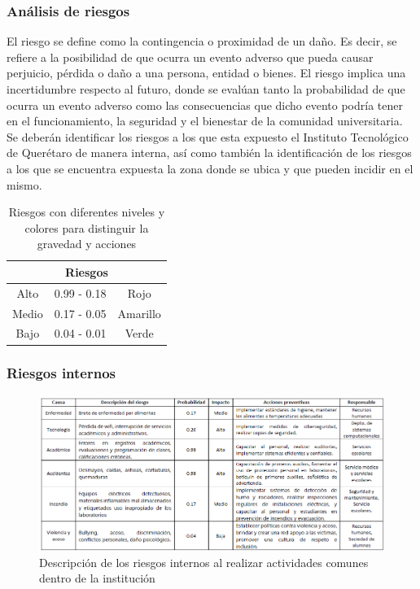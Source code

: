     \subsubsection{ Análisis de riesgos}
    El riesgo se define como la contingencia o proximidad de un daño.\cite{RAE} Es decir, se refiere a la posibilidad de que ocurra un evento adverso que pueda causar perjuicio, pérdida o daño a una persona, entidad o bienes. El riesgo implica una incertidumbre respecto al futuro, donde se evalúan tanto la probabilidad de que ocurra un evento adverso como las consecuencias que dicho evento podría tener en el funcionamiento, la seguridad y el bienestar de la comunidad universitaria.
    Se deberán identificar los riesgos a los que esta expuesto el Instituto Tecnológico de Querétaro de manera interna, así como también la identificación de los riesgos a los que se encuentra expuesta la zona donde se ubica y que pueden incidir en el mismo.
    \begin{table}[h]
        \centering
        \caption{Riesgos con diferentes niveles y colores para distinguir la gravedad y acciones}
        \begin{tabular}{c c c}
        \hline
        \multicolumn{3}{c}{\textbf{Riesgos}}\\
        \hline
             Alto& 0.99 - 0.18 & Rojo  \\
        \hline
             Medio& 0.17 - 0.05 & Amarillo  \\
        \hline
             Bajo& 0.04 - 0.01 & Verde \\
        \hline     
        \end{tabular}
        \label{tab:riego}
    \end{table}
    
    \subsubsection{Riesgos internos}
    \begin{figure}[H]
        \centering
        \includegraphics[scale=0.3]{34/img/riesgosInternos.png}
        \caption{Descripción de los riesgos internos al realizar actividades comunes dentro de la institución}
        \label{fig:enter-label6}
    \end{figure}
     
